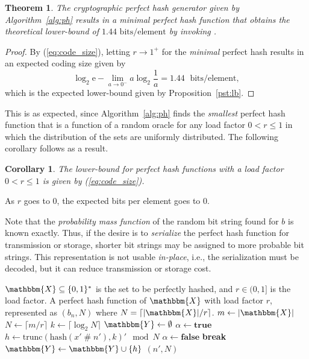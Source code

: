 \documentclass[hidelinks,11pt,final]{article}
\newcommand{\envnumstyle}{section}
\theoremstyle{plain}
\newtheorem{theorem}{Theorem}[\envnumstyle]
\newtheorem{corollary}{Corollary}[theorem]
\newcommand{\cat}{\mathbin{\#}}
\newcommand{\Break}{\textbf{break}}
\newcommand{\True}{\textbf{true}}
\newcommand{\False}{\textbf{false}}
\begin{document}
\begin{theorem}
The cryptographic perfect hash generator given by Algorithm~\ref{alg:ph} results in a \emph{minimal} perfect hash function that obtains the theoretical lower-bound of $1.44\text{ bits/element}$ by invoking .
\end{theorem}
\begin{proof}
By (\ref{eq:code_size}), letting $r \to 1^{+}$ for the \emph{minimal} perfect hash results in an expected coding size given by
\begin{equation}
    \log_2 \mathrm{e} - \lim_{a \to 0^{-}} a \log_2 \frac{1}{a} = 1.44 \; \text{ bits/element},
\end{equation}
which is the expected lower-bound given by Proposition~\ref{pst:lb}.
\end{proof}
This is as expected, since Algorithm~\ref{alg:ph} finds the \emph{smallest} perfect hash function that is a function of a random oracle for any load factor $0 < r \leq 1$ in which the distribution of the sets are uniformly distributed. The following corollary follows as a result.
\begin{corollary}
The lower-bound for perfect hash functions with a load factor $0 < r \leq 1$ is given by (\ref{eq:code_size}).
\end{corollary}
As $r$ goes to $0$, the expected bits per element goes to $0$.

Note that the \emph{probability mass function} of the random bit string found for $b$ is known exactly. Thus, if the desire is to \emph{serialize} the perfect hash function for transmission or storage, shorter bit strings may be assigned to more probable bit strings. This representation is not usable \emph{in-place}, i.e., the serialization must be decoded, but it can reduce transmission or storage cost.

\begin{algorithm}
	\caption{Cryptographic perfect hash function constructor (single-level)}
	\label{alg:ph}
	\KwIn
	{
		$\mathbbm{X} \subseteq \{0,1\}^*$ is the set to be perfectly hashed, and
		$r \in (0,1]$ is the load factor.
	}
	\KwOut
	{
		A perfect hash function of $\mathbbm{X}$ with load factor $r$, represented as $(b_n, N)$ where $N = \lceil |\mathbbm{X}|/r \rceil$.
	}
	{
		$m \gets |\mathbbm{X}|$\;
		$N \gets \lceil m / r \rceil$\;
		$k \gets \lceil\log_2 N\rceil$\;
		{
			$\mathbbm{Y} \gets \emptyset$\;
			$\alpha \gets \True$\;
			{
				$h \gets \mathrm{trunc}\!\left(\mathrm{hash}(x' \cat n'),k\right)' \mod N$\;
				{
					$\alpha \gets \False$\;
					\Break\;
				}
				$\mathbbm{Y} \gets \mathbbm{Y} \cup \{h\}$\;
			}
			\If{$\alpha$}
			{
				\Return $(n', N)$\;
			}
		}
	}
\end{algorithm}
\end{document}
